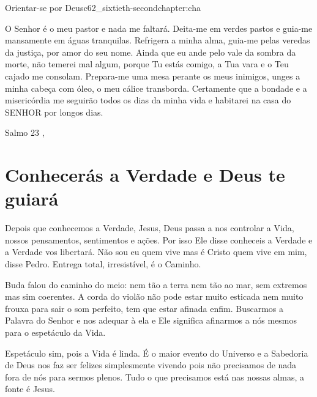 \begin{chapterpage}{Orientar-se por Deus}{c62_sixtieth-secondchapter:cha}
 
\begin{myquotation}O Senhor é o meu pastor e nada me faltará. Deita-me em verdes pastos e guia-me mansamente em águas tranquilas. Refrigera a minha alma, guia-me pelas veredas da justiça, por amor do seu nome. Ainda que eu ande pelo vale da sombra da morte, não temerei mal algum, porque Tu estás comigo, a Tua vara e o Teu cajado me consolam. Prepara-me uma mesa perante os meus inimigos, unges a minha cabeça com óleo, o meu cálice transborda. Certamente que a bondade e a misericórdia me seguirão todos os dias da minha vida e habitarei na casa do SENHOR por longos dias.
\par\vspace*{15mm}
\mbox{}\hfill \emdash{}Salmo 23
, %
\par\end{myquotation}

\end{chapterpage}



\section{Conhecerás a Verdade e Deus te guiará}\label{c1_basicformatting:sec}

\emdash{}Depois que conhecemos a Verdade, Jesus, Deus passa a nos controlar a Vida, nossos pensamentos, sentimentos e ações. Por isso Ele disse conheceis a Verdade e a Verdade vos libertará. Não sou eu quem vive mas é Cristo quem vive em mim, disse Pedro. Entrega total, irresistível, é o Caminho. 

\emdash{}Buda falou do caminho do meio: nem tão a terra nem tão ao mar, sem extremos mas sim coerentes. A corda do violão não pode estar muito esticada nem muito frouxa para sair o som perfeito, tem que estar afinada enfim. Buscarmos a Palavra do Senhor e nos adequar à ela e Ele significa afinarmos a nós mesmos para o espetáculo da Vida.

\emdash{}Espetáculo sim, pois a Vida é linda. É o maior evento do Universo e a Sabedoria de Deus nos faz ser felizes simplesmente vivendo pois não precisamos de nada fora de nós para sermos plenos. Tudo o que precisamos está nas nossas almas, a fonte é Jesus. 

